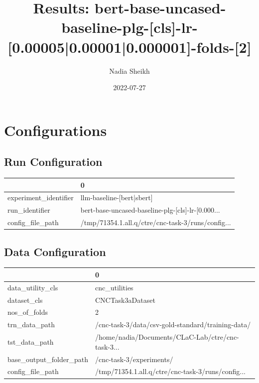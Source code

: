 \documentclass{article}
\title{Results: bert-base-uncased-baseline-plg-[cls]-lr-[0.00005|0.00001|0.000001]-folds-[2]}
\author{Nadia Sheikh}
\date{2022-07-27}
\begin{document}
\maketitle
\section{Configurations}
\subsection{Run Configuration}
\begin{tabular}{ll}
\toprule
{} &                                                  0 \\
\midrule
experiment\_identifier &                          llm-baseline-[bert|sbert] \\
run\_identifier        &  bert-base-uncased-baseline-plg-[cls]-lr-[0.000... \\
config\_file\_path      &  /tmp/71354.1.all.q/ctre/cnc-task-3/runs/config... \\
\bottomrule
\end{tabular}

\subsection{Data Configuration}
\begin{tabular}{ll}
\toprule
{} &                                                  0 \\
\midrule
data\_utility\_cls        &                                      cnc\_utilities \\
dataset\_cls             &                                   CNCTask3aDataset \\
nos\_of\_folds            &                                                  2 \\
trn\_data\_path           &  /cnc-task-3/data/csv-gold-standard/training-data/ \\
tst\_data\_path           &  /home/nadia/Documents/CLaC-Lab/ctre/cnc-task-3... \\
base\_output\_folder\_path &                           /cnc-task-3/experiments/ \\
config\_file\_path        &  /tmp/71354.1.all.q/ctre/cnc-task-3/runs/config... \\
\bottomrule
\end{tabular}
\end{document}
